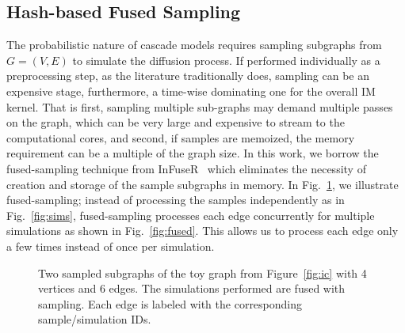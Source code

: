 \documentclass[review]{elsarticle}
\begin{document}
\subsection{Hash-based Fused Sampling}
The probabilistic nature of cascade models requires sampling subgraphs from $G = (V, E)$ to simulate the diffusion process. If performed individually as a preprocessing step, as the literature traditionally does, sampling can be an expensive stage, furthermore, a time-wise dominating one for the overall IM kernel. That is first, sampling multiple sub-graphs may demand multiple passes on the graph, which can be very large and expensive to stream to the computational cores, and second, if samples are memoized, the memory requirement can be a multiple of the graph size. 
In this work, we borrow the fused-sampling technique from {\sc InFuseR}~\cite{infuser} which eliminates the necessity of creation and storage of the sample subgraphs in memory. 
In Fig.~\ref{fig:traversal}, we illustrate fused-sampling; instead of processing the samples independently as in Fig.~\ref{fig:sims}, fused-sampling processes each edge concurrently for multiple simulations as shown in Fig.~\ref{fig:fused}. This allows us to process each edge only a few times instead of once per simulation.


\begin{figure}[!ht] 
    \centering
  \caption{\small{
  \protect{} Two sampled subgraphs of the toy graph from Figure~\ref{fig:ic} with 4 vertices and 6 edges.
  \protect{} The simulations performed are fused with sampling. Each edge is labeled with the corresponding sample/simulation IDs. 
  }}
  \label{fig:traversal} 
\end{figure}
\end{document}

